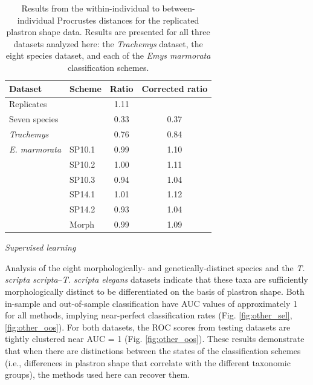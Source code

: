 \documentclass[12pt,letterpaper]{article}
\renewcommand{\subsection}[1]{%
\bigskip
\begin{center}
\begin{large}
\normalfont\itshape #1
\end{large}
\end{center}}
\begin{document}
\begin{table}
  \centering
  \caption{Results from the within-individual to between-individual Procrustes distances for the replicated plastron shape data. Results are presented for all three datasets analyzed here: the \textit{Trachemys} dataset, the eight species dataset, and each of the \textit{Emys marmorata} classification schemes.}
  \begin{tabular}{l l c c}
    \textbf{Dataset} & \textbf{Scheme} & \textbf{Ratio} & \textbf{Corrected ratio} \\
    \hline
    Replicates & & 1.11 & \\
    \hline
    Seven species & & 0.33 & 0.37 \\
    \textit{Trachemys} & & 0.76 & 0.84 \\
    \hline
    \textit{E. marmorata} & SP10.1 & 0.99 & 1.10 \\
     & SP10.2 & 1.00 & 1.11 \\
     & SP10.3 & 0.94 & 1.04 \\
     & SP14.1 & 1.01 & 1.12 \\
     & SP14.2 & 0.93 & 1.04 \\
     & Morph & 0.99 & 1.09 \\
    \hline
  \end{tabular}
  \label{tab:rep_res}
\end{table}


\subsection{Supervised learning}

Analysis of the eight morphologically- and genetically-distinct species and the \textit{T. scripta scripta}--\textit{T. scripta elegans} datasets indicate that these taxa are sufficiently morphologically distinct to be differentiated on the basis of plastron shape. Both in-sample and out-of-sample classification have AUC values of approximately 1 for all methods, implying near-perfect classification rates (Fig. \ref{fig:other_sel}, \ref{fig:other_oos}). For both datasets, the ROC scores from testing datasets are tightly clustered near AUC = 1 (Fig. \ref{fig:other_oos}). These results demonstrate that when there are distinctions between the states of the classification schemes (i.e., differences in plastron shape that correlate with the different taxonomic groups), the methods used here can recover them.
\end{document}
